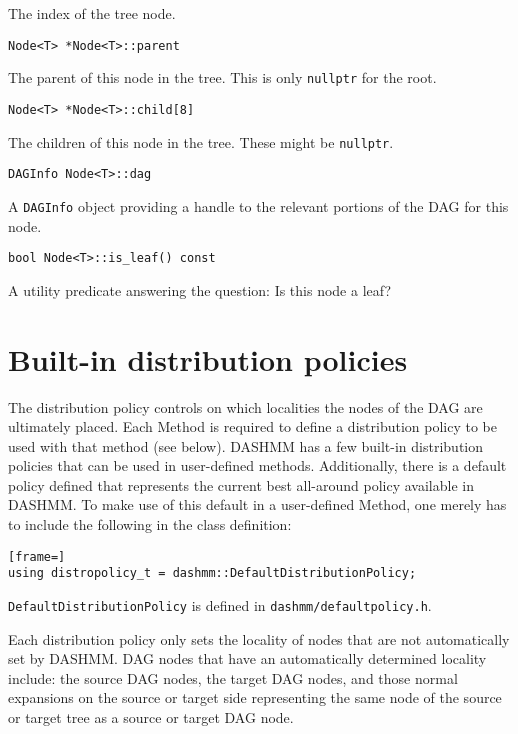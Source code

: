 \noindent The index of the tree node.

\begin{lstlisting}
Node<T> *Node<T>::parent
\end{lstlisting}

\noindent The parent of this node in the tree. This is only \texttt{nullptr} for
the root.

\begin{lstlisting}
Node<T> *Node<T>::child[8]
\end{lstlisting}

\noindent The children of this node in the tree. These might be
\texttt{nullptr}.

\begin{lstlisting}
DAGInfo Node<T>::dag
\end{lstlisting}

\noindent A \texttt{DAGInfo} object providing a handle to the relevant portions
of the DAG for this node.

\begin{lstlisting}
bool Node<T>::is_leaf() const
\end{lstlisting}

\noindent A utility predicate answering the question: Is this node a leaf?


\section{Built-in distribution policies}

The distribution policy controls on which localities the nodes of the DAG
are ultimately placed. Each Method is required to define a distribution policy
to be used with that method (see below). DASHMM has a few built-in distribution
policies that can be used in user-defined methods. Additionally, there is a
default policy defined that represents the current best all-around policy
available in DASHMM. To make use of this default in a user-defined Method,
one merely has to include the following in the class definition:

\begin{lstlisting}[frame=]
using distropolicy_t = dashmm::DefaultDistributionPolicy;
\end{lstlisting}

\noindent \texttt{DefaultDistributionPolicy} is defined in
\texttt{dashmm/defaultpolicy.h}.

Each distribution policy only sets the locality of nodes that are not
automatically set by DASHMM. DAG nodes that have an automatically determined
locality include: the source DAG nodes, the target DAG nodes, and those
normal expansions on the source or target side representing the same node of
the source or target tree as a source or target DAG node.

